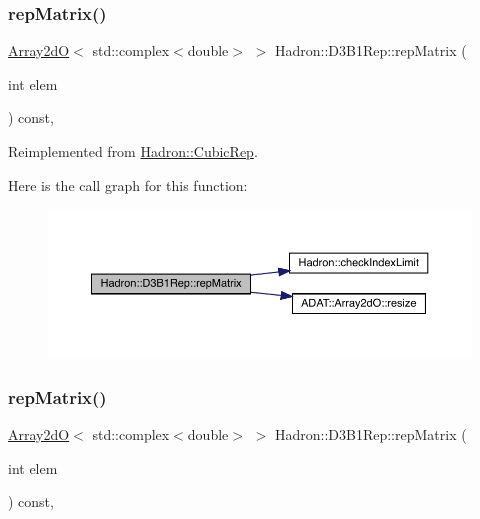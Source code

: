 \subsubsection{\texorpdfstring{repMatrix()}{repMatrix()}\hspace{0.1cm}{\footnotesize\ttfamily [1/3]}}
{\footnotesize\ttfamily \mbox{\hyperlink{classADAT_1_1Array2dO}{Array2dO}}$<$ std\+::complex$<$double$>$ $>$ Hadron\+::\+D3\+B1\+Rep\+::rep\+Matrix (\begin{DoxyParamCaption}\item[{int}]{elem }\end{DoxyParamCaption}) const\hspace{0.3cm}{\ttfamily [inline]}, {\ttfamily [virtual]}}



Reimplemented from \mbox{\hyperlink{structHadron_1_1CubicRep_ac5d7e9e6f4ab1158b5fce3e4ad9e8005}{Hadron\+::\+Cubic\+Rep}}.

Here is the call graph for this function\+:
\nopagebreak
\begin{figure}[H]
\begin{center}
\leavevmode
\includegraphics[width=350pt]{de/dc2/structHadron_1_1D3B1Rep_a2a0563aa28c476f89e8b13f3a95b7cfd_cgraph}
\end{center}
\end{figure}
\mbox{\label{structHadron_1_1D3B1Rep_a2a0563aa28c476f89e8b13f3a95b7cfd}} 
\subsubsection{\texorpdfstring{repMatrix()}{repMatrix()}\hspace{0.1cm}{\footnotesize\ttfamily [2/3]}}
{\footnotesize\ttfamily \mbox{\hyperlink{classADAT_1_1Array2dO}{Array2dO}}$<$ std\+::complex$<$double$>$ $>$ Hadron\+::\+D3\+B1\+Rep\+::rep\+Matrix (\begin{DoxyParamCaption}\item[{int}]{elem }\end{DoxyParamCaption}) const\hspace{0.3cm}{\ttfamily [inline]}, {\ttfamily [virtual]}}




